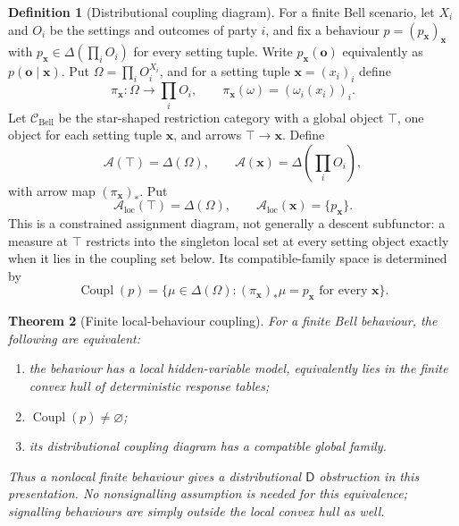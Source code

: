 \documentclass[11pt]{article}
\theoremstyle{plain}
\newtheorem{theorem}{Theorem}[section]
\theoremstyle{definition}
\newtheorem{definition}[theorem]{Definition}
\theoremstyle{remark}
\newcommand{\LocalAdm}{\mathcal{A}_{\mathrm{loc}}}
\begin{document}
\begin{definition}[Distributional coupling diagram]\label{def:bellpack}
For a finite Bell scenario, let $X_i$ and $O_i$ be the settings and outcomes of
party $i$, and fix a behaviour $p=(p_{\mathbf x})_{\mathbf x}$ with
$p_{\mathbf x}\in\Delta(\prod_iO_i)$ for every setting tuple. Write
$p_{\mathbf x}(\mathbf o)$ equivalently as $p(\mathbf o\mid\mathbf x)$. Put
$\Omega=\prod_iO_i^{X_i}$, and for a setting tuple
$\mathbf x=(x_i)_i$ define
\[
\pi_{\mathbf x}:\Omega\to\prod_iO_i,
\qquad
\pi_{\mathbf x}(\omega)=(\omega_i(x_i))_i.
\]
Let $\mathcal C_{\mathrm{Bell}}$ be the star-shaped restriction category with a
global object $\top$, one object for each setting tuple $\mathbf x$, and arrows
$\top\to\mathbf x$. Define
\[
\mathcal A(\top)=\Delta(\Omega),
\qquad
\mathcal A(\mathbf x)=\Delta\!\left(\prod_iO_i\right),
\]
with arrow map $(\pi_{\mathbf x})_*$. Put
\[
\LocalAdm(\top)=\Delta(\Omega),
\qquad
\LocalAdm(\mathbf x)=\{p_{\mathbf x}\}.
\]
This is a constrained assignment diagram, not generally a descent subfunctor: a
measure at $\top$ restricts into the singleton local set at every setting object
exactly when it lies in the coupling set below. Its compatible-family space is
determined by
\[
\operatorname{Coupl}(p)=
\{\mu\in\Delta(\Omega):
(\pi_{\mathbf x})_*\mu=p_{\mathbf x}
\text{ for every }\mathbf x\}.
\]
\end{definition}

\begin{theorem}[Finite local-behaviour coupling]\label{thm:bell}
For a finite Bell behaviour, the following are equivalent:
\begin{enumerate}[label=(\roman*)]
\item the behaviour has a local hidden-variable model, equivalently lies in the
finite convex hull of deterministic response tables;
\item $\operatorname{Coupl}(p)\ne\varnothing$;
\item its distributional coupling diagram has a compatible global family.
\end{enumerate}
Thus a nonlocal finite behaviour gives a distributional $\mathsf D$ obstruction
in this presentation. No nonsignalling assumption is needed for this equivalence;
signalling behaviours are simply outside the local convex hull as well.
\end{theorem}
\end{document}
